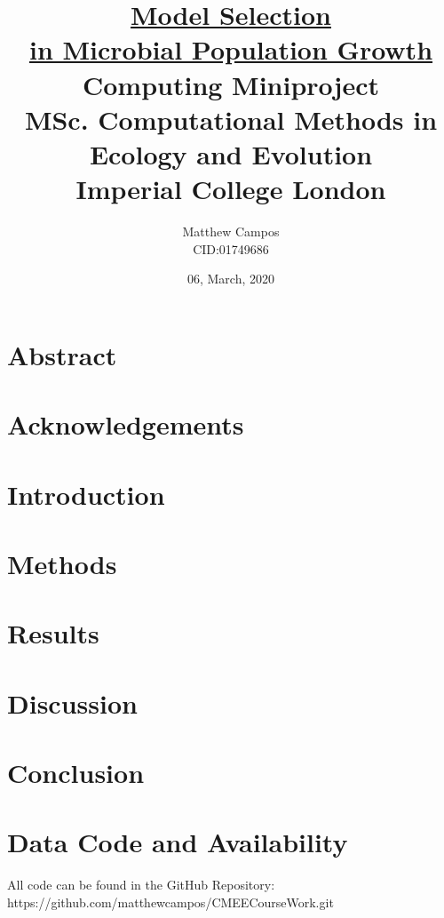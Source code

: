 \documentclass[11pt]{article}
\title{
        {\Huge{\textbf{\underline{Model Selection}}}}\\
        {\Huge{\textbf{\underline{in Microbial Population Growth}}}}\\
        {\large Computing Miniproject}\\
        {\large MSc. Computational Methods in Ecology and Evolution}\\
        {\large Imperial College London}\\
}
\author{Matthew Campos \\CID:01749686}
\date{06, March, 2020}
\begin{document}
    \maketitle

\newpage

\linenumbers

\section*{Abstract}
%

\newpage

\section*{Acknowledgements}
%

\newpage

\tableofcontents

\newpage

\section{Introduction}


\section{Methods}


\section{Results}


\section{Discussion}


\section{Conclusion}


\newpage

\section*{Data Code and Availability}
All code can be found in the GitHub Repository:
{https://github.com/matthewcampos/CMEECourseWork.git}

\newpage



\end{document}
